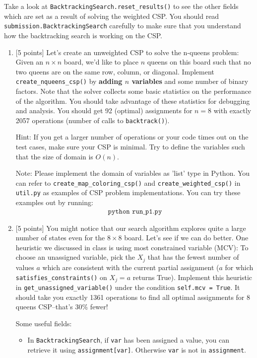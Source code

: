\documentclass{article}
\theoremstyle{case}
\theoremstyle{definition}
\begin{document}
Take a look at \texttt{BacktrackingSearch.reset\_results()} to see the other fields which are set as a result of solving the weighted CSP. You should read \texttt{submission.BacktrackingSearch} carefully to make sure that you understand how the backtracking search is working on the CSP. 

\begin{enumerate}[label=\alph*.]
    \item
    {[5 points]} Let's create an unweighted CSP to solve the n-queens problem: Given an $n\times n$ board, we'd like to place $n$ queens on this board such that no two queens are on the same row, column, or diagonal. Implement \texttt{create\_nqueens\_csp()} by \textbf{adding $n$ variables} and some number of binary factors. Note that the solver collects some basic statistics on the performance of the algorithm. You should take advantage of these statistics for debugging and analysis. You should get 92 (optimal) assignments for $n=8$ with exactly 2057 operations (number of calls to \texttt{backtrack()}).

Hint: If you get a larger number of operations or your code times out on the test cases, make sure your CSP is minimal. Try to define the variables such that the size of domain is $O(n)$.

Note: Please implement the domain of variables as 'list' type in Python. You can refer to \texttt{create\_map\_coloring\_csp()} and \texttt{create\_weighted\_csp()} in \texttt{util.py} as examples of CSP problem implementations. You can try these examples out by running:
\begin{align*}
\texttt{python run\_p1.py}
\end{align*}
\item
{[5 points]} You might notice that our search algorithm explores quite a large number of states even for the $8\times 8$ board. Let's see if we can do better. One heuristic we discussed in class is using most constrained variable (MCV): To choose an unassigned variable, pick the $X_j$ that has the fewest number of values $a$ which are consistent with the current partial assignment ($a$ for which \texttt{satisfies\_constraints()} on $X_j=a$ returns True). Implement this heuristic in \texttt{get\_unassigned\_variable()} under the condition \texttt{self.mcv = True}. It should take you exactly 1361 operations to find all optimal assignments for 8 queens CSP--that's 30\% fewer!

Some useful fields:
\begin{itemize}
\item
In \texttt{BacktrackingSearch}, if \texttt{var} has been assigned a value, you can retrieve it using \texttt{assignment[var]}. Otherwise \texttt{var} is not in \texttt{assignment}.
\end{itemize}
\end{enumerate}
\end{document}
